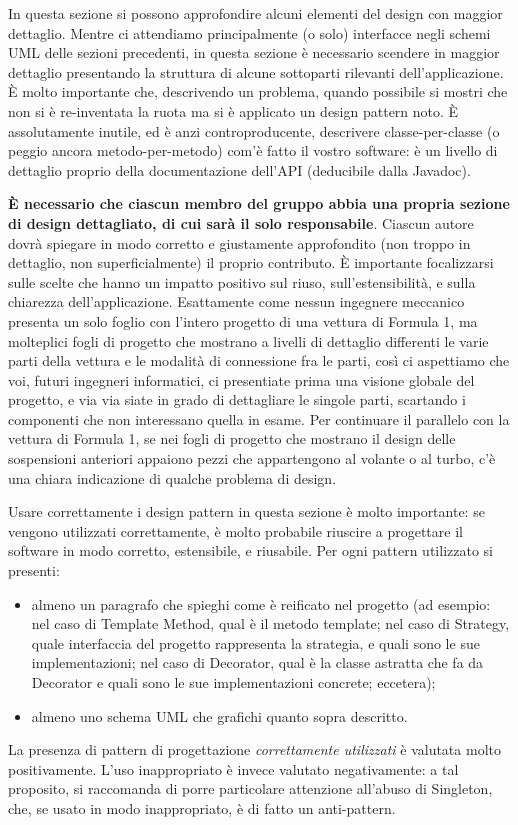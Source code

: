 In questa sezione si possono approfondire alcuni elementi del design con maggior dettaglio.
%
Mentre ci attendiamo principalmente (o solo) interfacce negli schemi UML delle sezioni precedenti, in questa sezione è necessario scendere in maggior dettaglio presentando la struttura di alcune sottoparti rilevanti dell'applicazione.
%
È molto importante che, descrivendo un problema, quando possibile si mostri che non si è re-inventata la ruota ma si è applicato un design pattern noto.
%
È assolutamente inutile, ed è anzi controproducente, descrivere classe-per-classe (o peggio ancora metodo-per-metodo) com'è fatto il vostro software: è un livello di dettaglio proprio della documentazione dell'API (deducibile dalla Javadoc).

\textbf{È necessario che ciascun membro del gruppo abbia una propria sezione di design dettagliato,
	di cui sarà il solo responsabile}.
%
Ciascun autore dovrà spiegare in modo corretto e giustamente approfondito (non troppo in dettaglio, non superficialmente) il proprio contributo.
%
È importante focalizzarsi sulle scelte che hanno un impatto positivo sul riuso, sull'estensibilità, e sulla chiarezza dell'applicazione.
%
Esattamente come nessun ingegnere meccanico presenta un solo foglio con l'intero progetto di una vettura di Formula 1, ma molteplici fogli di progetto che mostrano a livelli di dettaglio differenti le varie parti della vettura e le modalità di connessione fra le parti, così ci aspettiamo che voi, futuri ingegneri informatici, ci presentiate prima una visione globale del progetto, e via via siate in grado di dettagliare le singole parti, scartando i componenti che non interessano quella in esame.
%
Per continuare il parallelo con la vettura di Formula 1, se nei fogli di progetto che mostrano il
design delle sospensioni anteriori appaiono pezzi che appartengono al volante o al turbo, c'è una
chiara indicazione di qualche problema di design.

Usare correttamente i design pattern in questa sezione è molto importante: se vengono utilizzati correttamente, è molto probabile riuscire a progettare il software in modo corretto, estensibile, e riusabile.
%
Per ogni pattern utilizzato si presenti:
\begin{itemize}
	\item almeno un paragrafo che spieghi come è reificato nel progetto (ad esempio: nel caso di Template Method, qual è il metodo template; nel caso di Strategy, quale interfaccia del progetto rappresenta la strategia, e quali sono le sue implementazioni; nel caso di Decorator, qual è la classe astratta che fa da Decorator e quali sono le sue implementazioni concrete; eccetera);
	\item almeno uno schema UML che grafichi quanto sopra descritto.
\end{itemize}
%
La presenza di pattern di progettazione \emph{correttamente utilizzati} è valutata molto positivamente.
%
L'uso inappropriato è invece valutato negativamente: a tal proposito, si raccomanda di porre particolare attenzione all'abuso di Singleton, che, se usato in modo inappropriato, è di fatto un anti-pattern.

